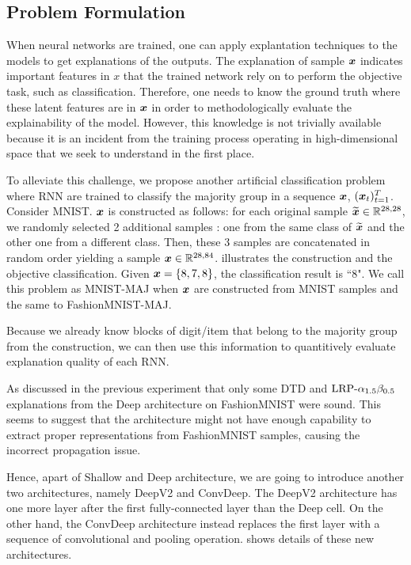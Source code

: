 \subsection{Problem Formulation} \label{sec:exp2_prob_formulate}
When neural networks are trained, one can apply explantation techniques to the models to get explanations of the outputs.  The explanation  of sample $\boldsymbol{x}$ indicates important features in $x$ that the trained network rely on to perform the objective task,  such as classification.  Therefore, one needs to know the ground truth where these latent features are in $\boldsymbol{x}$ in order to methodologically evaluate the explainability of the model.  However, this knowledge is not trivially available because it is an incident from the training process operating in high-dimensional space that we seek to understand in the first place.

To alleviate this challenge, we propose another artificial classification problem where RNN are trained to classify  the majority group in a sequence $\boldsymbol{x}$, $(\boldsymbol{x}_t )_{t=1}^{T}$. Consider MNIST. $\boldsymbol{x}$ is constructed as follows: for each original sample $\widetilde{\boldsymbol{x}} \in \mathbb{R}^{28,28}$, we randomly selected 2 additional samples : one from the same class of $\widetilde{\boldsymbol{x}}$ and the other one from a different class. Then, these 3 samples are concatenated in random order yielding a sample $\boldsymbol{x} \in \mathbb{R}^{28,84}$.  \addfigure{\ref{fig:artificial_problem_3digits}} illustrates the construction and the objective classification. Given $\boldsymbol{x} = \{ 8, 7, 8\}$, the classification result is ``8".  We call this problem as MNIST-MAJ when $\boldsymbol{x}$ are constructed from MNIST samples and the same to FashionMNIST-MAJ.

Because we already know blocks of digit/item that belong to the majority group from the construction,  we can then use this information to  quantitively evaluate  explanation quality  of each RNN.


As discussed in the previous experiment that only some DTD and $\text{LRP-}\alpha_{1.5}\beta_{0.5}$ explanations from the Deep architecture on FashionMNIST were sound. This seems to suggest that the architecture might not have enough capability to extract proper representations from FashionMNIST samples, causing the incorrect propagation issue.

Hence, apart of Shallow and Deep architecture, we are going to  introduce another two architectures, namely DeepV2 and ConvDeep. The DeepV2 architecture has one more layer after the first fully-connected layer than the Deep cell. On the other hand, the ConvDeep architecture instead replaces the first layer with  a sequence of convolutional and pooling operation. \addfigure{\ref{fig:deep_conv_arch}} shows details of these new architectures.


